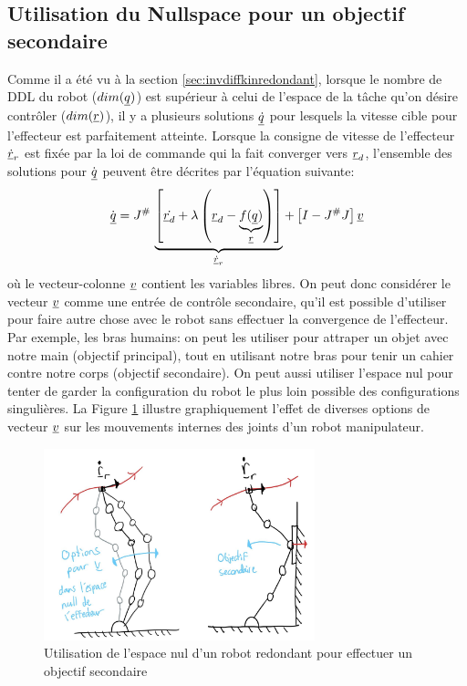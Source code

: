 \subsection{Utilisation du Nullspace pour un objectif secondaire}

Comme il a été vu à la section \ref{sec:invdiffkinredondant}, lorsque le nombre de DDL du robot ($dim(\underline{q})$) est supérieur à celui de l'espace de la tâche qu'on désire contrôler ($dim(\underline{r})$), il y a plusieurs solutions $\underline{\dot{q}}$ pour lesquels la vitesse cible pour l'effecteur est parfaitement atteinte. Lorsque la consigne de vitesse de l'effecteur $\underline{\dot{r}}_r$ est fixée par la loi de commande qui la fait converger vers $\underline{r}_d$,  l'ensemble des solutions pour $\dot{\underline{q}}$ peuvent être décrites par l'équation suivante:
\begin{align}
	\dot{\underline{q}} = J^{\#} \,
	\underbrace{
		\left[ \dot{\underline{r}_d} + \lambda \left( \underline{r}_d  - \underbrace{f(\underline{q})}_{\underline{r}}  \right)\right]
	}_{\underline{\dot{r}}_r}
	+ \left[ I - J^{\#}J  \right] \underline{v}
\end{align}
où le vecteur-colonne $\underline{v}$ contient les variables libres. On peut donc considérer le vecteur $\underline{v}$ comme une entrée de contrôle secondaire, qu'il est possible d'utiliser pour faire autre chose avec le robot sans effectuer la convergence de l'effecteur. Par exemple, les bras humains: on peut les utiliser pour attraper un objet avec notre main (objectif principal), tout en utilisant notre bras pour tenir un cahier contre notre corps (objectif secondaire). On peut aussi utiliser l'espace nul pour tenter de garder la configuration du robot le plus loin possible des configurations singulières. La Figure \ref{fig:nullspacecontrol} illustre graphiquement l'effet de diverses options de vecteur $\underline{v}$ sur les mouvements internes des joints d'un robot manipulateur.

\begin{figure}[H]
	\centering
	\includegraphics[width=0.70\textwidth]{fig/nullspacecontrol.jpg}
	\caption{Utilisation de l'espace nul d'un robot redondant pour effectuer un objectif secondaire}
	\label{fig:nullspacecontrol}
\end{figure}



